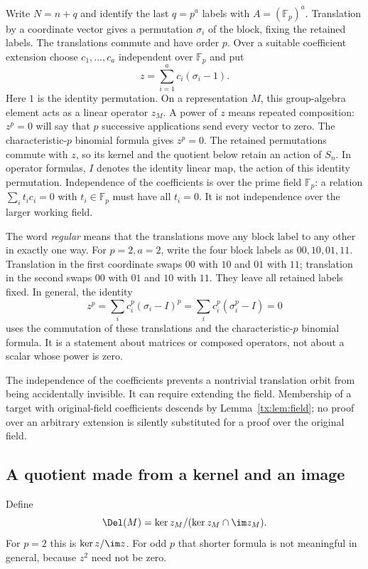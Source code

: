 Write $N=n+q$ and identify the last $q=p^a$ labels with
$A=(\mathbb F_p)^a$. Translation by a coordinate vector gives a
permutation $\sigma_i$ of the block, fixing the retained labels. The
translations commute and have order $p$. Over a suitable coefficient
extension choose $c_1,\ldots,c_a$ independent over $\mathbb F_p$ and put
\[
                 z=\sum_{i=1}^a c_i(\sigma_i-1).
\]
Here $1$ is the identity permutation. On a representation $M$, this
group-algebra element acts as a linear operator $z_M$. A power of $z$
means repeated composition: $z^p=0$ will say that $p$ successive
applications send every vector to zero.
The characteristic-$p$ binomial formula gives $z^p=0$. The retained
permutations commute with $z$, so its kernel and the quotient below
retain an action of $S_n$.
In operator formulas, $I$ denotes the identity linear map, the action
of this identity permutation. Independence of the coefficients is
over the prime field $\mathbb F_p$: a relation
$\sum_i t_i c_i=0$ with $t_i\in\mathbb F_p$ must have all
$t_i=0$. It is not independence over the larger working field.

The word \emph{regular} means that the translations move any block
label to any other in exactly one way. For $p=2,a=2$, write the
four block labels as $00,10,01,11$. Translation in the first
coordinate swaps $00$ with $10$ and $01$ with $11$; translation
in the second swaps $00$ with $01$ and $10$ with $11$. They
leave all retained labels fixed. In general, the identity
\[
 z^p=\sum_i c_i^p(\sigma_i-I)^p
     =\sum_i c_i^p(\sigma_i^p-I)=0
\]
uses the commutation of these translations and the characteristic-$p$
binomial formula. It is a statement about matrices or composed
operators, not about a scalar whose power is zero.

The independence of the coefficients prevents a nontrivial translation
orbit from being accidentally invisible. It can require extending the
field. Membership of a target with original-field coefficients descends
by Lemma~\ref{tx:lem:field}; no proof over an arbitrary extension is
silently substituted for a proof over the original field.

\subsection*{A quotient made from a kernel and an image}
Define
\[
                 \Del(M)=\ker z_M/(\ker z_M\cap\im z_M).
\]
For $p=2$ this is $\ker z/\im z$. For odd $p$ that shorter formula
is not meaningful in general, because $z^2$ need not be zero.

